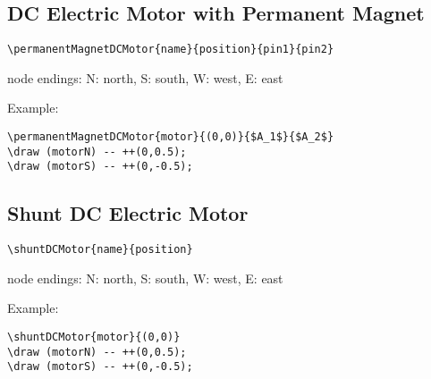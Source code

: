 \documentclass[parskip=full]{scrartcl}
\begin{document}
\subsection{DC Electric Motor with Permanent Magnet}

\begin{verbatim}
\permanentMagnetDCMotor{name}{position}{pin1}{pin2}
\end{verbatim}
node endings: N: north, S: south, W: west, E: east

Example:\\
\begin{minipage}{0.8\textwidth}
\begin{verbatim}
\permanentMagnetDCMotor{motor}{(0,0)}{$A_1$}{$A_2$}
\draw (motorN) -- ++(0,0.5);
\draw (motorS) -- ++(0,-0.5);
\end{verbatim}
\end{minipage}
\begin{minipage}{0.19\textwidth}
\end{minipage}

\subsection{Shunt DC Electric Motor}

\begin{verbatim}
\shuntDCMotor{name}{position}
\end{verbatim}
node endings: N: north, S: south, W: west, E: east

Example:\\
\begin{minipage}{0.8\textwidth}
\begin{verbatim}
\shuntDCMotor{motor}{(0,0)}
\draw (motorN) -- ++(0,0.5);
\draw (motorS) -- ++(0,-0.5);
\end{verbatim}
\end{minipage}
\begin{minipage}{0.19\textwidth}
\end{minipage}
\end{document}
